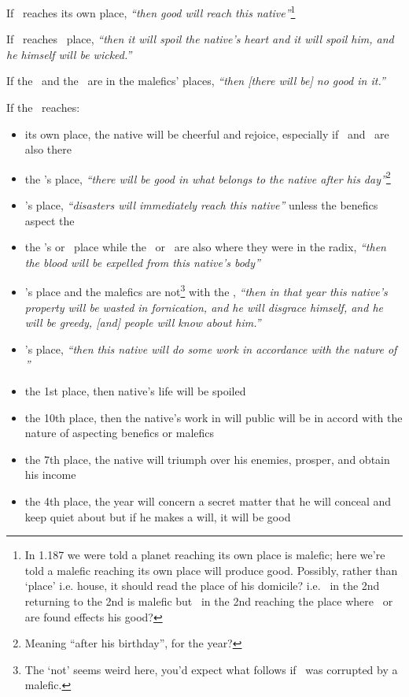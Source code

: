 If  \Saturn\, reaches its own place, \textsl{``then good will reach this native''}\footnote{In 1.187 we were told a planet reaching its own place is malefic; here we're told a malefic reaching its own place will produce good. Possibly, rather than `place' i.e. house, it should read the place of his domicile? i.e. \Saturn\, in the 2nd returning to the 2nd is malefic but \Saturn\, in the 2nd reaching the place where \Capricorn\, or \Aquarius\, are found effects his good?}

If  \Saturn\, reaches \Mars\, place, \textsl{``then it will spoil the native's heart and it will spoil him, and he himself will be wicked.''}

If  the \Sun\, and the \Moon\, are in the malefics' places, \textsl{``then [there will be] no good in it.''}

If  the \Moon\, reaches:
\begin{itemize}[topsep=0em,itemsep=0em]
\item its own place, the native will be cheerful and rejoice, especially if \Venus\, and \Jupiter\, are also there

\item the \Sun's place, \textsl{``there will be good in what belongs to the native after his day''}\footnote{Meaning ``after his birthday'', for the year?}

\item \Mars's place, \textsl{``disasters will immediately reach this native''} unless the benefics aspect the \Moon

\item the \Sun's or \Mars\, place while the \Sun\, or \Mars\, are also where they were in the radix, \textsl{``then the blood will be expelled from this native's body''}

\item \Venus's place and the malefics are not\footnote{The `not' seems weird here, you'd expect what follows if \Venus\, was corrupted by a malefic.} with the \Moon, \textsl{``then in that year this native's property will be wasted in fornication, and he will disgrace himself, and he will be greedy, [and] people will know about him.''}

\item \Mercury's place, \textsl{``then this native will do some work in accordance with the nature of \Mercury''}

\item the 1st place, then native's life will be spoiled

\item the 10th place, then the native's work in will public will be in accord with the nature of aspecting benefics or malefics

\item the 7th place, the native will triumph over his enemies, prosper, and obtain his income

\item the 4th place, the year will concern a secret matter that he will conceal and keep quiet about but if he makes a will, it will be good
\end{itemize}

